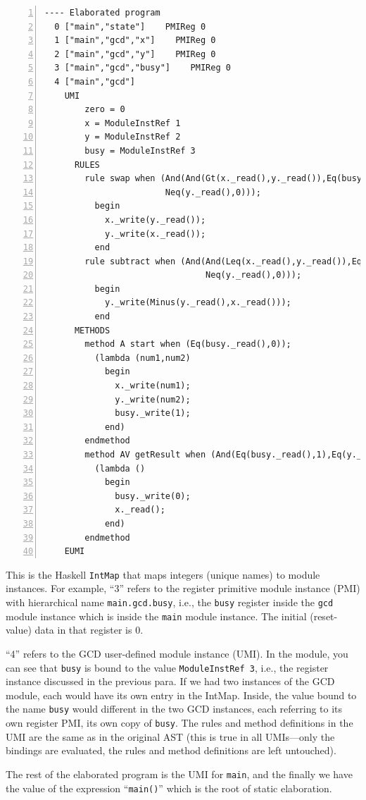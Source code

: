 \documentclass[11pt]{article}
\newcommand{\term}[1]{\texttt{#1}}
\begin{document}
\begin{Verbatim}[frame=single, numbers=left, commandchars=\\\{\}]
---- Elaborated program
  0 ["main","state"]    PMIReg 0
  1 ["main","gcd","x"]    PMIReg 0
  2 ["main","gcd","y"]    PMIReg 0
  3 ["main","gcd","busy"]    PMIReg 0
  4 ["main","gcd"]
    UMI 
        zero = 0
        x = ModuleInstRef 1
        y = ModuleInstRef 2
        busy = ModuleInstRef 3
      RULES
        rule swap when (And(And(Gt(x._read(),y._read()),Eq(busy._read(),1)),
                        Neq(y._read(),0)));
          begin
            x._write(y._read());
            y._write(x._read());
          end
        rule subtract when (And(And(Leq(x._read(),y._read()),Eq(busy._read(),1)),
                                Neq(y._read(),0)));
          begin
            y._write(Minus(y._read(),x._read()));
          end
      METHODS
        method A start when (Eq(busy._read(),0));
          (lambda (num1,num2) 
            begin
              x._write(num1);
              y._write(num2);
              busy._write(1);
            end)
        endmethod
        method AV getResult when (And(Eq(busy._read(),1),Eq(y._read(),0)));
          (lambda () 
            begin
              busy._write(0);
              x._read();
            end)
        endmethod
    EUMI
\end{Verbatim}

This is the Haskell \term{IntMap} that maps integers (unique names) to
module instances.  For example, ``3'' refers to the register primitive
module instance (PMI) with hierarchical name \term{main.gcd.busy},
i.e., the \term{busy} register inside the \term{gcd} module instance
which is inside the \term{main} module instance.  The initial
(reset-value) data in that register is 0.

``4'' refers to the GCD user-defined module instance (UMI). In the
module, you can see that \term{busy} is bound to the value
\verb|ModuleInstRef 3|, i.e., the register instance discussed in the
previous para.  If we had two instances of the GCD module, each would
have its own entry in the IntMap.  Inside, the value bound to the name
\term{busy} would different in the two GCD instances, each referring
to its own register PMI, its own copy of \term{busy}.  The rules and
method definitions in the UMI are the same as in the original AST
(this is true in all UMIs---only the bindings are evaluated, the rules
and method definitions are left untouched).

The rest of the elaborated program is the UMI for \term{main}, and the
finally we have the value of the expression ``\term{main()}'' which is
the root of static elaboration.
\end{document}
